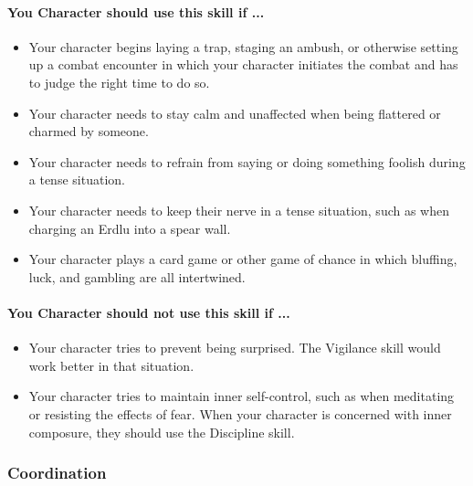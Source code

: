 \begin{multicols}{2}
\paragraph{You Character should use this skill if ...}
\begin{itemize}
    \item Your character begins laying a trap, staging an ambush, or otherwise
        setting up a combat encounter in which your character initiates the
        combat and has to judge the right time to do so.
    \item Your character needs to stay calm and unaffected when being flattered
        or charmed by someone.
    \item Your character needs to refrain from saying or doing something foolish
        during a tense situation.
    \item Your character needs to keep their nerve in a tense situation, such as
        when charging an Erdlu into a spear wall.
    \item Your character plays a card game or other game of chance in which bluffing,
        luck, and gambling are all intertwined.
\end{itemize}
\paragraph{You Character should not use this skill if ...}
\begin{itemize}
    \item Your character tries to prevent being surprised. The Vigilance skill
        would work better in that situation.
    \item Your character tries to maintain inner self-control, such as when
        meditating or resisting the effects of fear. When your character is
        concerned with inner composure, they should use the Discipline skill.
\end{itemize}

\subsubsection{Coordination}\label{skill:coordination}

\end{multicols}
